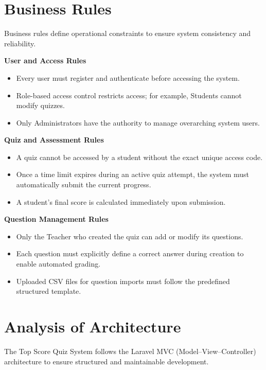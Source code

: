 \section{Business Rules}

Business rules define operational constraints to ensure system consistency and reliability.

\textbf{User and Access Rules}
\begin{itemize}
\item Every user must register and authenticate before accessing the system.
\item Role-based access control restricts access; for example, Students cannot modify quizzes.
\item Only Administrators have the authority to manage overarching system users.
\end{itemize}

\textbf{Quiz and Assessment Rules}
\begin{itemize}
\item A quiz cannot be accessed by a student without the exact unique access code.
\item Once a time limit expires during an active quiz attempt, the system must automatically submit the current progress.
\item A student’s final score is calculated immediately upon submission.
\end{itemize}

\textbf{Question Management Rules}
\begin{itemize}
\item Only the Teacher who created the quiz can add or modify its questions.
\item Each question must explicitly define a correct answer during creation to enable automated grading.
\item Uploaded CSV files for question imports must follow the predefined structured template.
\end{itemize}


\section{Analysis of Architecture}

The Top Score Quiz System follows the Laravel MVC (Model–View–Controller) architecture to ensure structured and maintainable development.

